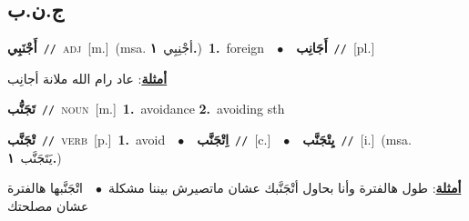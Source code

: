 \documentclass[10pt,a4paper,twoside]{article} %
\begin{document}
\begin{multicols}{2}
\vspace{-3mm}
\subsection*{\color{blue}\foreignlanguage{arabic}{ج.ن.ب}\color{blue}{}} 

{\setlength\topsep{0pt}\textbf{\foreignlanguage{arabic}{أَجْنَبِي}}\ {\color{gray}\texttt{//}\color{black}}\ \textsc{adj}\ [m.]\ \color{gray}(msa. \foreignlanguage{arabic}{أجْنِبِي}~\foreignlanguage{arabic}{\textbf{١.}})\color{black}\ \textbf{1.}~foreign\ \ $\bullet$\ \ \setlength\topsep{0pt}\textbf{\foreignlanguage{arabic}{أَجَانِب}}\ {\color{gray}\texttt{//}\color{black}}\ [pl.]\  \begin{flushright}\color{gray}\foreignlanguage{arabic}{\textbf{\underline{\foreignlanguage{arabic}{أمثلة}}}: عاد رام الله ملانة أجانِب}\end{flushright}\color{black}} \vspace{2mm}

{\setlength\topsep{0pt}\textbf{\foreignlanguage{arabic}{تَجَنُّب}}\ {\color{gray}\texttt{//}\color{black}}\ \textsc{noun}\ [m.]\ \textbf{1.}~avoidance  \textbf{2.}~avoiding sth\ } \vspace{2mm}

{\setlength\topsep{0pt}\textbf{\foreignlanguage{arabic}{تْجَنَّب}}\ {\color{gray}\texttt{//}\color{black}}\ \textsc{verb}\ [p.]\ \textbf{1.}~avoid\ \ $\bullet$\ \ \setlength\topsep{0pt}\textbf{\foreignlanguage{arabic}{اِتْجَنَّب}}\ {\color{gray}\texttt{//}\color{black}}\ [c.]\ \ $\bullet$\ \ \setlength\topsep{0pt}\textbf{\foreignlanguage{arabic}{يِتْجَنَّب}}\ {\color{gray}\texttt{//}\color{black}}\ [i.]\ \color{gray}(msa. \foreignlanguage{arabic}{يَتَجَنَّب}~\foreignlanguage{arabic}{\textbf{١.}})\color{black}\  \begin{flushright}\color{gray}\foreignlanguage{arabic}{\textbf{\underline{\foreignlanguage{arabic}{أمثلة}}}: طول هالفترة وأنا بحاول أتْجَنَّبك عشان ماتصيرش بيننا مشكلة\ $\bullet$\ \  اتْجَنَّبها هالفترة عشان مصلحتك}\end{flushright}\color{black}} \vspace{2mm}


\end{multicols}
\end{document}
